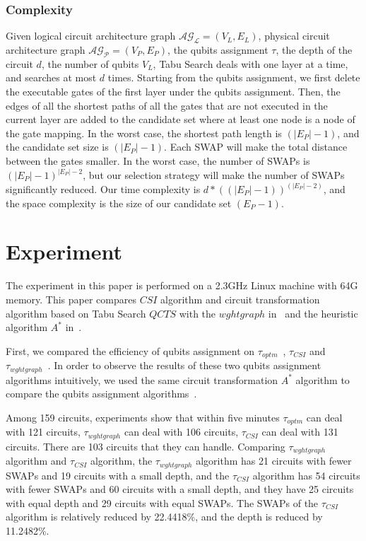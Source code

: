 \documentclass[runningheads]{llncs}
\begin{document}
\subsubsection{Complexity}
Given logical circuit architecture graph  $\mathcal{AG_{L}}=(V_{L},E_{L})$, physical circuit architecture graph $\mathcal{AG_{P}}=(V_{P},E_{P})$, the qubits assignment $\tau$, the depth of the circuit $d$, the number of qubits $V_{L}$, Tabu Search deals with one layer at a time, and searches at most $d$ times. Starting from the qubits assignment, we first delete the executable gates of the first layer under the qubits assignment. Then, the edges of all the shortest paths of all the gates that are not executed in the current layer are added to the candidate set where at least one node is a node of the gate mapping. In the worst case, the shortest path length is $(|E_{P}|-1)$, 
and the candidate set size is $(|E_{P}|-1)$. Each SWAP will make the total distance between the gates smaller. In the worst case, the number of SWAPs is $(|E_{P}|-1)^{|E_{P}|-2}$, but our selection strategy will make the number of SWAPs significantly reduced. Our time complexity is $d*((|E_{P}|-1))^{(|E_{P}|-2)}$, and the space complexity is the size of our candidate set $(E_{P}-1)$.
\section{Experiment}
\label{Experiment}
The experiment in this paper is performed on a 2.3GHz Linux machine with 64G memory. This paper compares  $CSI$  algorithm 
and circuit transformation algorithm based on Tabu Search $QCTS$ with the $wghtgraph$ in~\cite{2020Qubit} and the heuristic algorithm $ A^{*}$  in~\cite{Zulehner2017}.
 
First, we compared the efficiency of qubits assignment on $\tau_{optm}$~\cite{Zulehner2017},  $\tau_{CSI}$ and $\tau_{wghtgraph}$~\cite{2020Qubit}. In order to observe the results of these two qubits assignment algorithms intuitively, we used the same circuit transformation $ A^{*}$ algorithm to compare the qubits assignment algorithms~\cite{Zulehner2017}.

Among 159 circuits, experiments show that within five minutes $\tau_{optm}$ can deal with 121 circuits, $\tau_{wghtgraph}$  can deal with 106 circuits, $\tau_{CSI}$  can deal with  131 circuits. There are 103 circuits that they can handle. Comparing $\tau_{wghtgraph}$ algorithm and $\tau_{CSI}$ algorithm, the $\tau_{wghtgraph}$ algorithm has 21 circuits with fewer SWAPs and 19 circuits with a small depth, and the $\tau_{CSI}$ algorithm has 54 circuits with fewer SWAPs and 60 circuits with a small depth, and they have 25 circuits with equal depth and  29 circuits with equal SWAPs. The SWAPs of the $\tau_{CSI}$ algorithm is relatively reduced by 22.4418\%, 
and the depth is reduced by 11.2482\%.
\end{document}
